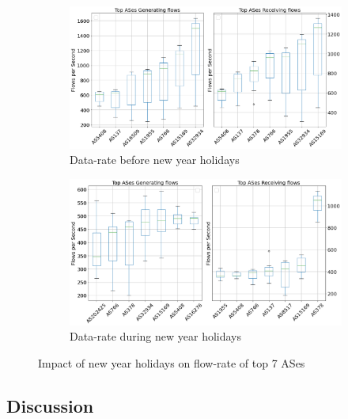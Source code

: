 \documentclass[10pt, journal, letterpaper]{IEEEtran}
\begin{document}
\begin{figure}[hbt!]
    \centering
    \begin{subfigure}{\columnwidth}
          \centering
          \includegraphics[width=\columnwidth]{img/OWBCH_top7ASes_fps.png}
          \caption{Data-rate before new year holidays}
          \label{fig:OWBCH_topAS_fps}
    \end{subfigure}
    \begin{subfigure}{\columnwidth}
          \centering
          \includegraphics[width=\columnwidth]{img/CH2_top7ASes_fps.png}
          \caption{Data-rate during new year holidays}
          \label{fig:CH_topAS_fps}
    \end{subfigure}
    \caption{Impact of new year holidays on flow-rate of top 7 ASes}
    \label{fig:topAS_fps_OW_CH}
\end{figure}



\subsection{Discussion}
\end{document}
